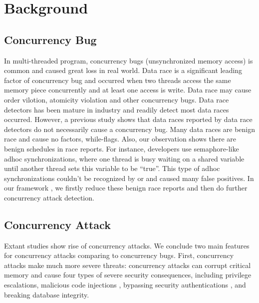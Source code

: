 \section{Background}\label{sec:background}

\subsection{Concurrency Bug}

In multi-threaded program, concurrency bugs (unsynchronized memory access) is common and caused great loss in real world\cite{nasdaq, therac}.  
Data race is a significant leading factor of concurrency bug and occurred when two threads 
access the same memory piece concurrently and at least one access is write\cite{datacollider:osdi10,savage:eraser, yu:racetrack:sosp}. 
Data race may cause order vilotion, atomicity violation and other concurrency bugs.
Data race detectors has been mature in industry\cite{tsan,valgrind:pldi} and 
readily detect most data races occurred.
However, a previous study \cite{lu:concurrency-bugs} shows that 
data races reported by data race detectors do not necessarily cause a concurrency bug. 
Many data races are benign race and cause no factors, \eg while-flags.
Also, our observation shows there are benign schedules in race reports.
For instance,
developers use semaphore-like adhoc synchronizations,
where one thread is busy waiting on a shared variable until
another thread sets this variable to be ``true''. This type of adhoc
synchronizations couldn’t be recognized by \tsan or \ski
and caused many false positives.
In our framework \xxx, we firstly reduce these benign race reports and then do further concurrency attack detection.

 
\subsection{Concurrency Attack}

Extant studies \cite{con:hotpar12, acidrain:sigmod17} show rise of concurrency 
attacks. We conclude two main features for concurrency attacks comparing to concurrency bugs. 
First, concurrency attacks make much more severe threats:
concurrency attacks can corrupt critical memory and cause four
types of severe security consequences, including privilege escalations\cite{uselib-bug-12791, mysql-bug-24988},
malicious code injections \cite{msiexploit},  
bypassing security authentications\cite{cve-2010-0923, cve-2008-0034, cve-2010-1754}
, and breaking database integrity\cite{acidrain:sigmod17}. 


